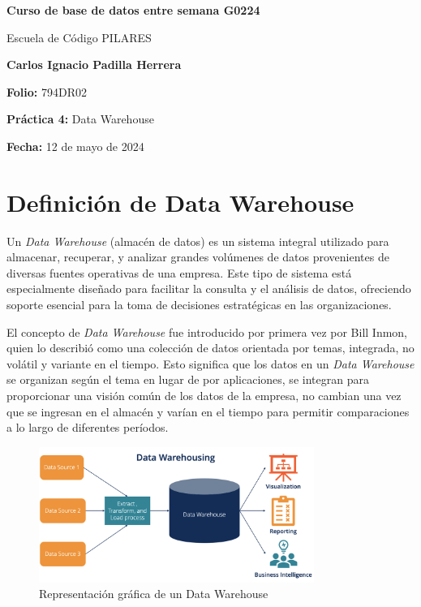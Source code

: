 \documentclass{article}
\begin{document}
\begin{titlepage}
    \centering
    \vspace*{1cm}
    \Huge\textbf{Curso de base de datos entre semana G0224}
    
    \vspace{0.5cm}
    \LARGE Escuela de Código PILARES
    
    \vspace{1.5cm}
    \textbf{Carlos Ignacio Padilla Herrera}
    
    \vspace{2cm}
    \Large\textbf{Folio:} 794DR02
    
    \vspace{0.5cm}
    \Large\textbf{Práctica 4:} Data Warehouse
    
    \vfill
    
    \Large\textbf{Fecha:} 12 de mayo de 2024
    
    \vspace{0.8cm}
\end{titlepage}

\section{Definición de Data Warehouse}
Un \textit{Data Warehouse} (almacén de datos) es un sistema integral utilizado para almacenar, recuperar, y analizar grandes volúmenes de datos provenientes de diversas fuentes operativas de una empresa. Este tipo de sistema está especialmente diseñado para facilitar la consulta y el análisis de datos, ofreciendo soporte esencial para la toma de decisiones estratégicas en las organizaciones.

El concepto de \textit{Data Warehouse} fue introducido por primera vez por Bill Inmon, quien lo describió como una colección de datos orientada por temas, integrada, no volátil y variante en el tiempo. Esto significa que los datos en un \textit{Data Warehouse} se organizan según el tema en lugar de por aplicaciones, se integran para proporcionar una visión común de los datos de la empresa, no cambian una vez que se ingresan en el almacén y varían en el tiempo para permitir comparaciones a lo largo de diferentes períodos.

\begin{figure}[ht]
    \centering
    \includegraphics[width=0.8\textwidth]{data-warehouse.png}
    \caption{Representación gráfica de un Data Warehouse}
\end{figure}
\end{document}
